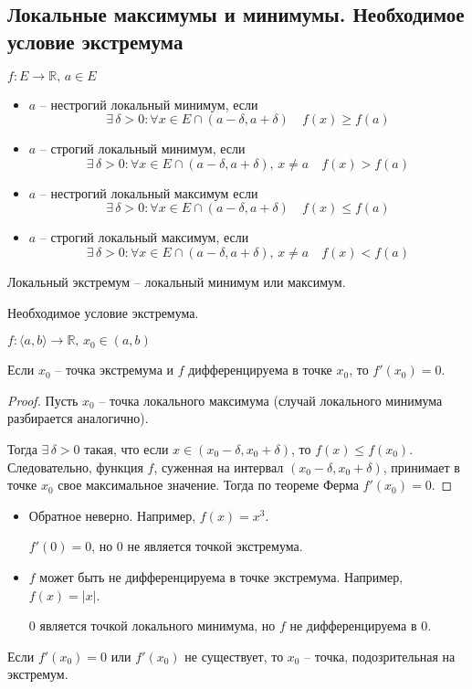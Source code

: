 \subsection{Локальные максимумы и минимумы. Необходимое условие экстремума \href{https://youtu.be/CAxh8kYEOlQ?t=45}{\Walley}}
\begin{conj}
    $f: E \to \mathbb{R}, \, a \in E$
    \begin{itemize}
        \item $a$ -- нестрогий локальный минимум, если
        \[ \exists \, \delta > 0 : \forall x \in E \cap (a - \delta, a + \delta) \quad f(x) \geqslant f(a) \]
        \item $a$ -- строгий локальный минимум, если
        \[ \exists \, \delta > 0 : \forall x \in E \cap (a - \delta, a + \delta), \, x \neq a \quad f(x) > f(a) \]
        \item $a$ -- нестрогий локальный максимум если
        \[ \exists \, \delta > 0 : \forall x \in E \cap (a - \delta, a + \delta) \quad f(x) \leqslant f(a) \]
        \item $a$ -- строгий локальный максимум, если
        \[ \exists \, \delta > 0 : \forall x \in E \cap (a - \delta, a + \delta), \, x \neq a \quad f(x) < f(a) \]
    \end{itemize}
    Локальный экстремум -- локальный минимум или максимум.
\end{conj}

\begin{theorem-non}
    Необходимое условие экстремума.

    $f: \langle a, b \rangle \to \mathbb{R}, \, x_0 \in (a, b)$

    Если $x_0$ -- точка экстремума и $f$ дифференцируема в точке $x_0$, то $f'(x_0) = 0$.
\end{theorem-non}

\begin{proof}
    Пусть $x_0$ -- точка локального максимума (случай локального минимума разбирается аналогично).

    Тогда $\exists \, \delta > 0$ такая, что если $x \in (x_0 - \delta, x_0 + \delta)$, то $f(x) \leqslant f(x_0)$.
    Следовательно, функция $f$, суженная на интервал $(x_0 - \delta, x_0 + \delta)$, принимает в точке $x_0$ свое максимальное значение. 
    Тогда по теореме Ферма $f'(x_0) = 0$. 
\end{proof}

\begin{notice}
    \begin{itemize}
        \item Обратное неверно. 
        Например, $f(x) = x^3$.
    
        $f'(0) = 0$, но 0 не является точкой экстремума.
        \item $f$ может быть не дифференцируема в точке экстремума.
        Например, $f(x) = |x|$.

        0 является точкой локального минимума, но $f$ не дифференцируема в 0.
    \end{itemize}
\end{notice}

Если $f'(x_0) = 0$ или $f'(x_0)$ не существует, то $x_0$ -- точка, подозрительная на экстремум.
